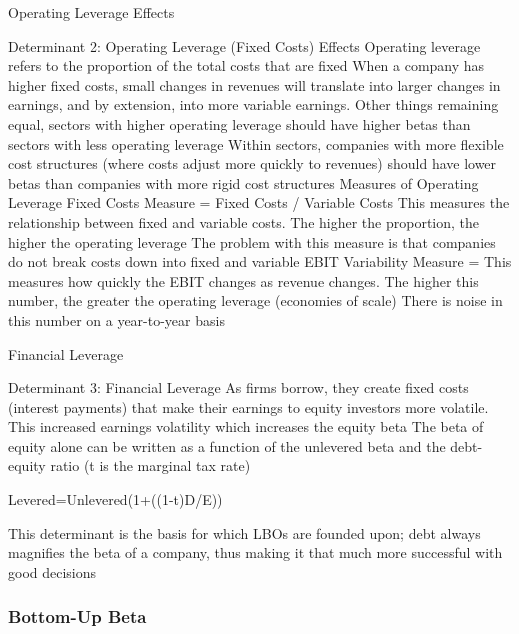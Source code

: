 \documentclass[10pt]{article}
\begin{document}
      \begin{core}{Operating Leverage Effects}

        Determinant 2: Operating Leverage (Fixed Costs) Effects
        Operating leverage refers to the proportion of the total costs that are fixed
        When a company has higher fixed costs, small changes in revenues will translate into larger changes in earnings, and by extension, into more variable earnings.
        Other things remaining equal, sectors with higher operating leverage should have higher betas than sectors with less operating leverage
        Within sectors, companies with more flexible cost structures (where costs adjust more quickly to revenues) should have lower betas than companies with more rigid cost structures
        Measures of Operating Leverage
        Fixed Costs Measure = Fixed Costs / Variable Costs
        This measures the relationship between fixed and variable costs. The higher the proportion, the higher the operating leverage
        The problem with this measure is that companies do not break costs down into fixed and variable
        EBIT Variability Measure = %
        This measures how quickly the EBIT changes as revenue changes. The higher this number, the greater the operating leverage (economies of scale)
        There is noise in this number on a year-to-year basis

      \end{core}

      \begin{core}{Financial Leverage}

        Determinant 3: Financial Leverage
        As firms borrow, they create fixed costs (interest payments) that make their earnings to equity investors more volatile. This increased earnings volatility which increases the equity beta
        The beta of equity alone can be written as a function of the unlevered beta and the debt-equity ratio (t is the marginal tax rate)

        Levered=Unlevered(1+((1-t)D/E))

        This determinant is the basis for which LBOs are founded upon; debt always magnifies the beta of a company, thus making it that much more successful with good decisions

      \end{core}

    \subsubsection{Bottom-Up Beta}
      
\end{document}
